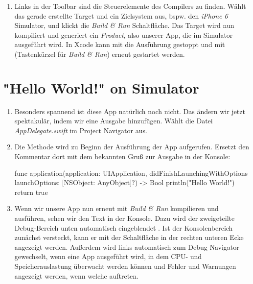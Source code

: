 \documentclass[parskip=half, final]{scrreprt}
\begin{document}
\begin{lecture}
\begin{enumerate}
\item Links in der Toolbar sind die Steuerelemente des Compilers zu finden. Wählt das gerade erstellte Target und ein Zielsystem aus, bspw. den \emph{iPhone 6} Simulator, und klickt die \emph{Build \& Run} Schaltfläche. Das Target wird nun kompiliert und generiert ein \emph{Product}, also unserer App, die im Simulator ausgeführt wird. In Xcode kann mit  die Ausführung gestoppt und mit  (Tastenkürzel für \emph{Build \& Run}) erneut gestartet werden.

\end{enumerate}


\section{"{}Hello World!"{} on Simulator}

\begin{enumerate}

\item Besonders spannend ist diese App natürlich noch nicht. Das ändern wir jetzt spektakulär, indem wir eine Ausgabe hinzufügen. Wählt die Datei \emph{AppDelegate.swift} im Project Navigator aus.

\item Die Methode  wird zu Beginn der Ausführung der App aufgerufen. Ersetzt den Kommentar dort mit dem bekannten Gruß zur Ausgabe in der Konsole:

\begin{swiftcode}
func application(application: UIApplication, didFinishLaunchingWithOptions launchOptions: [NSObject: AnyObject]?) -> Bool {
    println("Hello World!")
    return true
}
\end{swiftcode}

\item Wenn wir unsere App nun erneut mit \emph{Build \& Run} kompilieren und ausführen, sehen wir den Text  in der Konsole. Dazu wird der zweigeteilte Debug-Bereich unten automatisch eingeblendet . Ist der Konsolenbereich zunächst versteckt, kann er mit der Schaltfläche in der rechten unteren Ecke angezeigt werden. Außerdem wird links automatisch zum Debug Navigator gewechselt, wenn eine App ausgeführt wird, in dem CPU- und Speicherauslastung überwacht werden können und Fehler und Warnungen angezeigt werden, wenn welche auftreten.



\end{enumerate}
\end{lecture}
\end{document}
